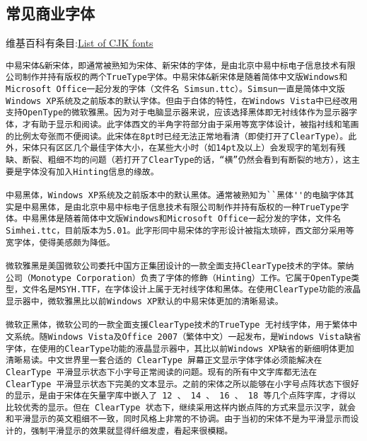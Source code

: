 \subsection{常见商业字体}
维基百科有条目:\href{http://en.wikipedia.org/wiki/List_of_CJK_fonts}{List of CJK fonts}

\begin{verbatim}
中易宋体&新宋体，即通常被熟知为宋体、新宋体的字体，是由北京中易中标电子信息技术有限公司制作并持有版权的两个TrueType字体。中易宋体&新宋体是随着简体中文版Windows和Microsoft Office一起分发的字体（文件名 Simsun.ttc）。Simsun一直是简体中文版Windows XP系统及之前版本的默认字体。但由于白体的特性，在Windows Vista中已经改用支持OpenType的微软雅黑。因为对于电脑显示器来说，应该选择黑体即无衬线体作为显示器字体，才有助于显示和阅读。此字体西文的半角字符部分由于采用等宽字体设计，被指衬线和笔画的比例太夸张而不便阅读。此宋体在8pt时已经无法正常地看清（即使打开了ClearType）。此外，宋体只有区区几个最佳字体大小，在某些大小时（如14pt及以上）会发现字的笔划有残缺、断裂、粗细不均的问题（若打开了ClearType的话，“横”仍然会看到有断裂的地方），这主要是字体没有加入Hinting信息的缘故。

中易黑体，Windows XP系统及之前版本中的默认黑体。通常被熟知为``黑体''的电脑字体其实是中易黑体，是由北京中易中标电子信息技术有限公司制作并持有版权的一种TrueType字体。中易黑体是随着简体中文版Windows和Microsoft Office一起分发的字体，文件名Simhei.ttc，目前版本为5.01。此字形同中易宋体的字形设计被指太琐碎，西文部分采用等宽字体，使得美感颇为降低。

微软雅黑是美国微软公司委托中国方正集团设计的一款全面支持ClearType技术的字体。蒙纳公司（Monotype Corporation）负责了字体的修飾（Hinting）工作。它属于OpenType类型，文件名是MSYH.TTF，在字体设计上属于无衬线字体和黑体。在使用ClearType功能的液晶显示器中，微软雅黑比以前Windows XP默认的中易宋体更加的清晰易读。

微软正黑体，微软公司的一款全面支援ClearType技术的TrueType 无衬线字体，用于繁体中文系统。随Windows Vista及Office 2007（繁体中文）一起发布，是Windows Vista缺省字体，在使用的ClearType功能的液晶显示器中，其比以前Windows XP缺省的新细明体更加清晰易读。中文世界里一套合适的 ClearType 屏幕正文显示字体字体必须能解决在 ClearType 平滑显示状态下小字号正常阅读的问题。现有的所有中文字库都无法在 ClearType 平滑显示状态下完美的文本显示。之前的宋体之所以能够在小字号点阵状态下很好的显示，是由于宋体在矢量字库中嵌入了 12 、 14 、 16 、 18 等几个点阵字库，才得以比较优秀的显示。但在 ClearType 状态下，继续采用这样内嵌点阵的方式来显示汉字，就会和平滑显示的英文粗细不一致，同时风格上非常的不协调。由于当初的宋体不是为平滑显示而设计的，强制平滑显示的效果就显得纤细发虚，看起来很模糊。


\end{verbatim}
